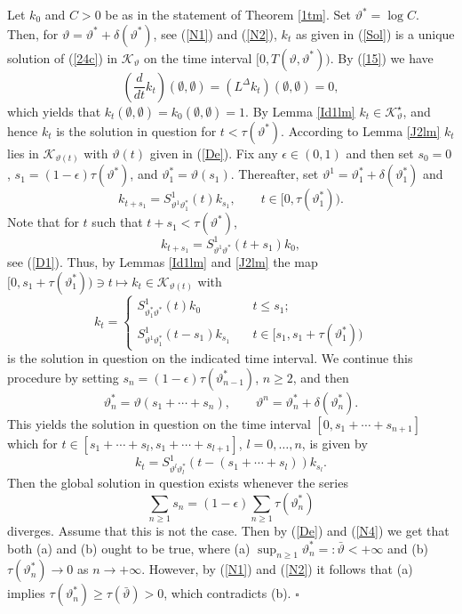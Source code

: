 \documentclass[reqno,11pt]{amsart}
\theoremstyle{definition}
\theoremstyle{remark}
\numberwithin{equation}{section}
\begin{document}
Let $k_0$ and $C>0$ be as in the statement of Theorem \ref{1tm}. Set
$\vartheta^*= \log C$. Then, for $\vartheta = \vartheta^* +
\delta(\vartheta^*)$, see (\ref{N1}) and (\ref{N2}), $k_t$ as given
in (\ref{Sol}) is a unique solution of (\ref{24c}) in
$\mathcal{K}_\vartheta$ on the time interval $[0,T(\vartheta,
\vartheta^*))$. By (\ref{15}) we have
\[
\left(\frac{d}{dt} k_t\right)(\emptyset, \emptyset) = (L^\Delta
k_t)(\emptyset, \emptyset) =0,
\]
which yields that $k_t(\emptyset, \emptyset) = k_0(\emptyset,
\emptyset) =1$. By Lemma \ref{Id1lm} $k_t \in
\mathcal{K}_\vartheta^\star$, and hence $k_t$ is the solution in
question for $t< \tau( \vartheta^*)$.
 According to Lemma \ref{J2lm} $k_t$ lies in
$\mathcal{K}_{\vartheta(t)}$ with $\vartheta (t)$ given in
(\ref{De}). Fix any $\epsilon \in (0,1)$ and then set $s_0=0$, $s_1
=(1-\epsilon) \tau(\vartheta^*)$, and $\vartheta^{*}_1 = \vartheta
(s_1)$. Thereafter, set  $\vartheta^1 = \vartheta^{*}_{1} +
\delta(\vartheta^{*}_{1})$ and
\begin{equation*}
  
 k_{t+  s_1} = S^1_{\vartheta^1 \vartheta^{*}_{1}}(t)k_{s_1}, \qquad t \in [0, \tau( \vartheta^{*}_{1})).
\end{equation*}
Note that for $t$ such that $t+s_1 < \tau(\vartheta^*)$,
\[
 k_{t+  s_1} = S^1_{\vartheta^1 \vartheta^{*}}(t+s_1)k_{0},
\]
see (\ref{D1}). Thus, by Lemmas \ref{Id1lm} and \ref{J2lm} the map
$[0, s_1 + \tau(\vartheta^{*}_{1})) \ni t \mapsto k_t \in
\mathcal{K}_{\vartheta(t)}$ with
\begin{equation*}
 
k_t = \left\{ \begin{array}{ll} S^1_{\vartheta^{*}_1
\vartheta^{*}}(t) k_0
\quad &t\leq s_1;\\[.3cm] S^1_{\vartheta^1 \vartheta^{*}_{1}}(t-s_1)
k_{s_1} \quad &t\in [s_1, s_1+ \tau( \vartheta^{*}_{1}))
\end{array} \right.
\end{equation*}
is the solution in question on the indicated time interval. We
continue this procedure by setting $s_n =(1-\epsilon)
\tau(\vartheta^*_{n-1})$, $n\geq 2$, and then
\begin{equation}
  \label{N4}
\vartheta^*_n = \vartheta(s_1+\cdots +s_n ), \qquad \vartheta^n =
\vartheta^*_n + \delta(\vartheta^*_n).
\end{equation}
This yields the solution in question on the time interval $[0, s_1 +
\cdots + s_{n+1}]$ which for $t \in [s_1 +\cdots + s_l, s_1 +\cdots
+ s_{l+1}]$, $l=0, \dots , n$, is given by
\[
k_t =  S^1_{\vartheta^l \vartheta^*_{l}}(t-(s_1 +\cdots +s_l))
k_{s_l}.
\]
Then the global solution in question exists whenever the series
\[
\sum_{n\geq 1}s_n = (1-\epsilon) \sum_{n\geq 1} \tau(\vartheta^*_n)
\]
diverges. Assume that this is not the case. Then by (\ref{De}) and
(\ref{N4}) we get that both (a) and (b) ought to be true, where (a)
$\sup_{n\geq 1} \vartheta^*_n =: \bar{\vartheta}<+ \infty$ and (b)
$\tau(\vartheta^*_n) \to 0$ as $n\to +\infty$. However, by
(\ref{N1}) and (\ref{N2}) it follows that (a) implies
$\tau(\vartheta^*_n) \geq \tau(\bar{\vartheta}) > 0$, which
contradicts (b). \hskip2.5cm $\square$
\end{document}
